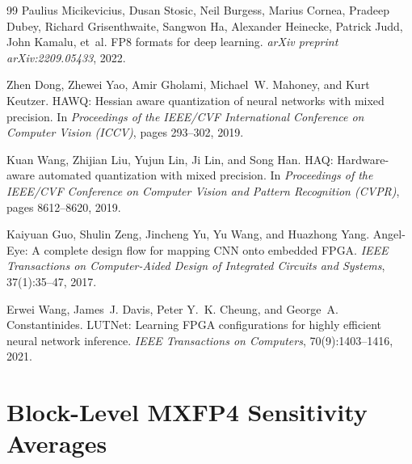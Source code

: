 \documentclass[11pt,a4paper]{article}
\begin{document}
\begin{thebibliography}{99}
Paulius Micikevicius, Dusan Stosic, Neil Burgess, Marius Cornea, Pradeep Dubey, Richard Grisenthwaite, Sangwon Ha, Alexander Heinecke, Patrick Judd, John Kamalu, et~al.
FP8 formats for deep learning.
\emph{arXiv preprint arXiv:2209.05433}, 2022.

Zhen Dong, Zhewei Yao, Amir Gholami, Michael~W. Mahoney, and Kurt Keutzer.
HAWQ: Hessian aware quantization of neural networks with mixed precision.
In \emph{Proceedings of the IEEE/CVF International Conference on Computer Vision (ICCV)}, pages 293--302, 2019.

Kuan Wang, Zhijian Liu, Yujun Lin, Ji Lin, and Song Han.
HAQ: Hardware-aware automated quantization with mixed precision.
In \emph{Proceedings of the IEEE/CVF Conference on Computer Vision and Pattern Recognition (CVPR)}, pages 8612--8620, 2019.

Kaiyuan Guo, Shulin Zeng, Jincheng Yu, Yu Wang, and Huazhong Yang.
Angel-Eye: A complete design flow for mapping CNN onto embedded FPGA.
\emph{IEEE Transactions on Computer-Aided Design of Integrated Circuits and Systems}, 37(1):35--47, 2017.

Erwei Wang, James~J. Davis, Peter Y.~K. Cheung, and George~A. Constantinides.
LUTNet: Learning FPGA configurations for highly efficient neural network inference.
\emph{IEEE Transactions on Computers}, 70(9):1403--1416, 2021.

\end{thebibliography}


\appendix

\section{Block-Level MXFP4 Sensitivity Averages}
\label{app:sensitivity}
\end{document}
